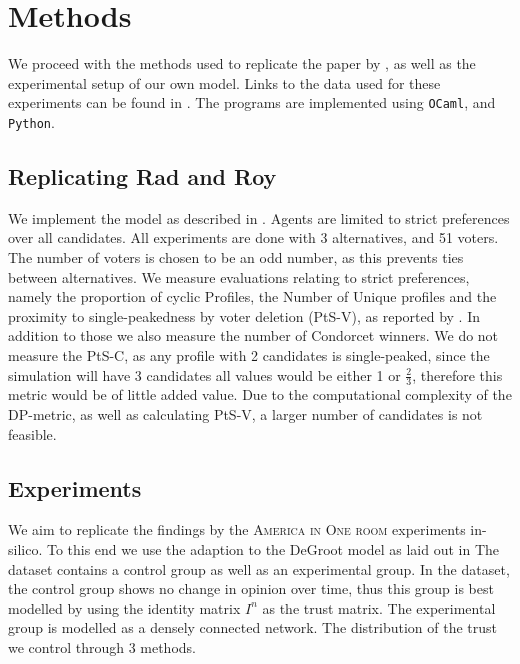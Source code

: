 \chapter{Methods}
\label{Methods}

%
%
%


We proceed with the methods used to replicate the paper by
\citet{radDeliberationSinglePeakednessCoherent2021}, as well as the
experimental setup of our own model. Links to the data used for these
experiments can be found in . The programs
are implemented using \texttt{OCaml}, and \texttt{Python}.


\section{Replicating Rad and Roy} We implement the model as described in
. Agents are limited to strict preferences over all
candidates. All experiments are done with 3 alternatives, and 51 voters. The
number of voters is chosen to be an odd number, as this prevents ties between
alternatives. We measure evaluations relating to strict preferences, namely the
proportion of cyclic Profiles, the Number of Unique profiles and the proximity
to single-peakedness by voter deletion (PtS-V), as reported by
\citet{radDeliberationSinglePeakednessCoherent2021}. In addition to those we
also measure the number of Condorcet winners. We do not measure the PtS-C, as
any profile with 2 candidates is single-peaked, since the simulation will have
3 candidates all values would be either 1 or $\frac{2}{3}$, therefore this
metric would be of little added value. Due to the computational complexity of
the DP-metric, as well as calculating PtS-V, a larger number of candidates is
not feasible.

\section{Experiments}

We aim to replicate the findings by the \textsc{America in One room}
experiments \cite{fishkinCanDeliberationHave2024} in-silico. To this end we
use the adaption to the DeGroot model as laid out in 
The dataset contains a control group as well as an experimental group. In the
dataset, the control group shows no change in opinion over time,
thus this group is best modelled by using the identity matrix $I^n$ as the
trust matrix. The experimental group is modelled as a densely connected
network.  The distribution of the trust we control through 3 methods.

